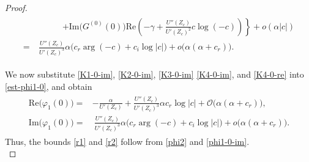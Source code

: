 \documentclass[reqno,11pt]{amsart}
\numberwithin{equation}{section}
\numberwithin{equation}{section}
\theoremstyle{plain}
\begin{document}
\begin{proof}
\begin{align}
\begin{aligned}
					&\qquad\quad \left.+\text{Im}\big(G^{(0)}(0)\big) \text{Re}\left(-\gamma+\frac{U''(Z_c)}{U'(Z_c)^2}c\log(-c)\right)\right\}+o(\alpha|c|)\\
					=&~\frac{U''(Z_c)}{U'(Z_c)^3} \alpha\big(c_r\arg(-c)+c_i\log|c|\big)+o\big(\alpha (\alpha+c_r)\big).
			\end{aligned}\end{align}
		
	We now substitute \eqref{K1-0-im}, \eqref{K2-0-im}, \eqref{K3-0-im} \eqref{K4-0-im}, and \eqref{K4-0-re} into \eqref{est-phi1-0}, and obtain
			\begin{align}\label{phi1-0-im}\begin{aligned}
					\text{Re}\big(\varphi_1(0)\big) =& -\frac{\alpha}{U'(Z_c)}+\frac{U''(Z_c)}{U'(Z_c)^3} \alpha c_r\log|c|+\mathcal{O}\big(\alpha (\alpha+c_r)\big),\\
					\text{Im}\big(\varphi_1(0)\big) =&~ \frac{U''(Z_c)}{U'(Z_c)^3} \alpha\big(c_r\arg(-c)+c_i\log|c|\big)+o\big(\alpha (\alpha+c_r)\big).
			\end{aligned}\end{align}
		Thus, the bounds \eqref{r1} and \eqref{r2} follow from \eqref{phi2} and \eqref{phi1-0-im}.\\
		

\end{proof}
\end{document}
